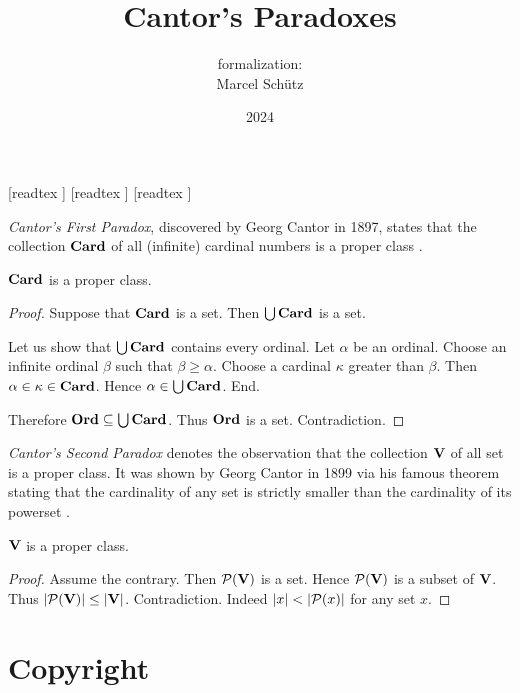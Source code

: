 \documentclass{article}
\title{Cantor's Paradoxes}
\author{\Naproche formalization: \vspace{0.5em} \\
Marcel Schütz}
\date{2024}
\begin{document}
  \maketitle

  \begin{imports}
    \begin{forthel}
      [readtex ]
      [readtex ]
      [readtex ]
    \end{forthel}
  \end{imports}

  \noindent \emph{Cantor's First Paradox}, discovered by Georg Cantor in 1897,
  states that the collection $\textbf{Card}$ of all (infinite) cardinal numbers is a
  proper class \cite[chapter 156]{Cantor1991}.

  \begin{forthel}
    \begin{theorem*}\label{cantor_paradox_1}
      $\textbf{Card}$ is a proper class.
    \end{theorem*}
    \begin{proof}
      Suppose that $\textbf{Card}$ is a set.
      Then $\bigcup \textbf{Card}$ is a set.

      Let us show that $\bigcup \textbf{Card}$ contains every ordinal.
        Let $\alpha$ be an ordinal.
        Choose an infinite ordinal $\beta$ such that $\beta \geq \alpha$.
        Choose a cardinal $\kappa$ greater than $\beta$.
        Then $\alpha \in \kappa \in \textbf{Card}$.
        Hence $\alpha \in \bigcup \textbf{Card}$.
      End.

      Therefore $\textbf{Ord} \subseteq \bigcup \textbf{Card}$.
      Thus $\textbf{Ord}$ is a set.
      Contradiction.
    \end{proof}
  \end{forthel}

  \emph{Cantor's Second Paradox} denotes the observation that the collection
  $\textbf{V}$ of all set is a proper class.
  It was shown by Georg Cantor in 1899 via his famous theorem stating that the
  cardinality of any set is strictly smaller than the cardinality of its 
  powerset \cite[chapter 163]{Cantor1991}.

  \begin{forthel}
    \begin{theorem*}\label{cantor_paradox_2}
      $\textbf{V}$ is a proper class.
    \end{theorem*}
    \begin{proof}
      Assume the contrary.
      Then $\mathcal{P}(\textbf{V})$ is a set.
      Hence $\mathcal{P}(\textbf{V})$ is a subset of $\textbf{V}$.
      Thus $|\mathcal{P}(\textbf{V})| \leq |\textbf{V}|$.
      Contradiction.
      Indeed $|x| < |\mathcal{P}(x)|$ for any set $x$.
    \end{proof}
  \end{forthel}

  \printbibliography

  \section*{Copyright}
  \doclicenseThis
\end{document}
